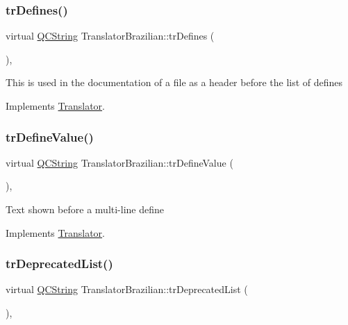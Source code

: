 \subsubsection{\texorpdfstring{trDefines()}{trDefines()}}
{\footnotesize\ttfamily virtual \mbox{\hyperlink{class_q_c_string}{Q\+C\+String}} Translator\+Brazilian\+::tr\+Defines (\begin{DoxyParamCaption}{ }\end{DoxyParamCaption})\hspace{0.3cm}{\ttfamily [inline]}, {\ttfamily [virtual]}}

This is used in the documentation of a file as a header before the list of defines 

Implements \mbox{\hyperlink{class_translator}{Translator}}.

\mbox{\label{class_translator_brazilian_a024ed5eaba8dd8d18274eb8ac7553a4e}} 
\subsubsection{\texorpdfstring{trDefineValue()}{trDefineValue()}}
{\footnotesize\ttfamily virtual \mbox{\hyperlink{class_q_c_string}{Q\+C\+String}} Translator\+Brazilian\+::tr\+Define\+Value (\begin{DoxyParamCaption}{ }\end{DoxyParamCaption})\hspace{0.3cm}{\ttfamily [inline]}, {\ttfamily [virtual]}}

Text shown before a multi-\/line define 

Implements \mbox{\hyperlink{class_translator}{Translator}}.

\mbox{\label{class_translator_brazilian_afa9f7f1cd8950fb31cdcf254aa6d433a}} 
\subsubsection{\texorpdfstring{trDeprecatedList()}{trDeprecatedList()}}
{\footnotesize\ttfamily virtual \mbox{\hyperlink{class_q_c_string}{Q\+C\+String}} Translator\+Brazilian\+::tr\+Deprecated\+List (\begin{DoxyParamCaption}{ }\end{DoxyParamCaption})\hspace{0.3cm}{\ttfamily [inline]}, {\ttfamily [virtual]}}

